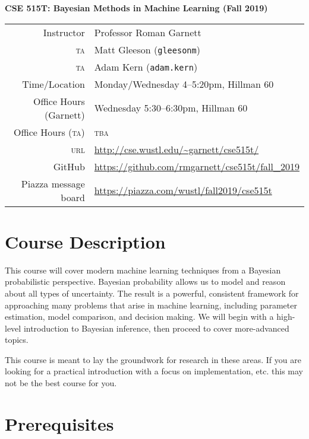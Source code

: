 \documentclass{article}
\newcommand{\acro}[1]{\textsc{\MakeLowercase{#1}}}
\begin{document}
{\large \textbf{CSE 515T: Bayesian Methods in Machine Learning (Fall 2019)}} \\[1ex]

\begin{tabular}{rl}
               Instructor & Professor Roman Garnett                                 \\
                \acro{TA} & Matt Gleeson (\texttt{gleesonm})                        \\
                \acro{TA} & Adam Kern (\texttt{adam.kern})                          \\
            Time/Location & Monday/Wednesday 4--5:20pm, Hillman 60                  \\
            Office Hours (Garnett) & Wednesday 5:30--6:30pm, Hillman 60             \\
 Office Hours (\acro{TA}) & \acro{TBA}                                              \\
               \acro{URL} & \url{http://cse.wustl.edu/~garnett/cse515t/}            \\
                   GitHub & \url{https://github.com/rmgarnett/cse515t/fall_2019}    \\
     Piazza message board & \url{https://piazza.com/wustl/fall2019/cse515t}
\end{tabular}

\section*{Course Description}

This course will cover modern machine learning techniques from a Bayesian
probabilistic perspective. Bayesian probability allows us to model and reason
about all types of uncertainty. The result is a powerful, consistent framework
for approaching many problems that arise in machine learning, including
parameter estimation, model comparison, and decision making. We will begin with
a high-level introduction to Bayesian inference, then proceed to cover
more-advanced topics.

This course is meant to lay the groundwork for research in these
areas. If you are looking for a practical introduction with a focus on
implementation, etc. this may not be the best course for you.

\section*{Prerequisites}
\end{document}
